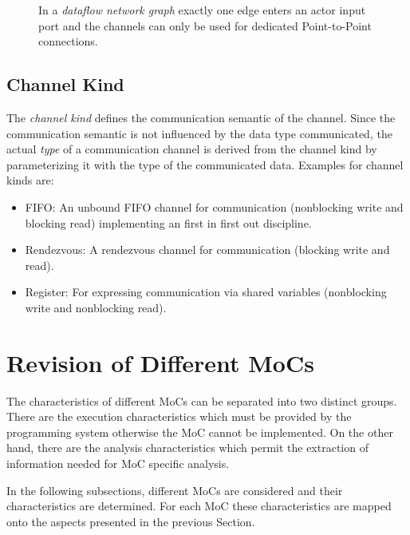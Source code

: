 \begin{figure}
\centering

\caption{\label{ng-dataflow}
  In a \emph{dataflow network graph} exactly
  one edge enters an actor input port and
  the channels can only be used for dedicated
  Point-to-Point connections.}
\end{figure}

\subsection{Channel Kind}\label{channel-kind}

The \emph{channel kind} defines the communication semantic of the channel.
Since the communication semantic is not influenced by the
data type communicated, the actual \emph{type} of a communication
channel is derived from the channel kind by parameterizing it with
the type of the communicated data. Examples for channel kinds are:

\begin{itemize}
\item \label{channel-kind-fifo} FIFO:
  An unbound FIFO channel for communication
  (nonblocking write and blocking read) implementing
  an first in first out discipline.

\item \label{channel-kind-rendezvous} Rendezvous:
  A rendezvous channel for communication %
  (blocking write and read).

\item \label{channel-kind-register} Register:
  For expressing communication via shared variables
  (nonblocking write and nonblocking read).
\end{itemize}

\section{Revision of Different MoCs}\label{revision-of-mocs}

The characteristics of different MoCs can be separated into two distinct groups.
There are the execution characteristics which must be provided by
the programming system otherwise the MoC cannot be implemented.
On the other hand, there are the analysis characteristics which
permit the extraction of information needed for MoC specific analysis.

In the following subsections, different MoCs are considered and their
characteristics are determined. For each MoC these characteristics are
mapped onto the aspects presented in the previous Section.

